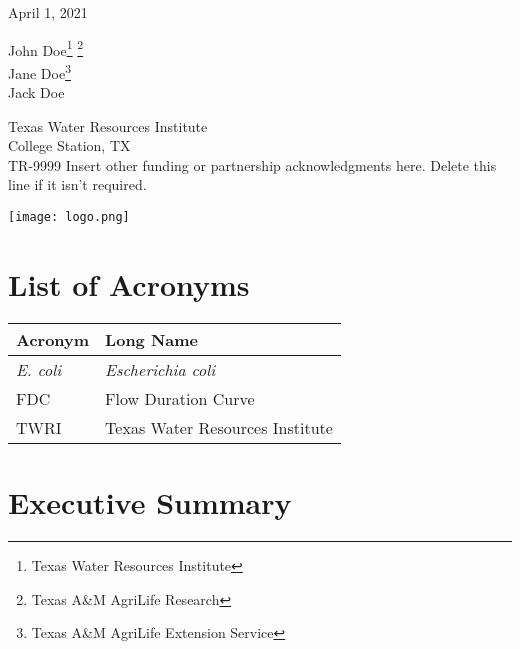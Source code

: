 \documentclass[fontsize=11pt,
titlepage=true,
footnotes=multiple
]{scrartcl}
\let\rmarkdownfootnote\footnote%
\def\footnote{\protect\rmarkdownfootnote}
\begin{document}
\begin{titlepage}

% 
\vspace*{4\baselineskip}
\begin{center}
\sffamily{\Huge\textcolor{twriblue}{Report Title}}


\rmfamily\normalsize{April 1, 2021}


\rmfamily\normalsize{John Doe\footnote{Texas Water Resources Institute\label{twri}} \footnote{Texas A\&M AgriLife Research\label{agr}}\\
Jane Doe\footnote{Texas A\&M AgriLife Extension Service\label{ext}}\\
Jack Doe}


\rmfamily\normalsize{Texas Water Resources Institute\\
College Station, TX\\
TR-9999}
\mbox{}
\vfill
\rmfamily\normalsize{Insert other funding or partnership acknowledgments here. Delete this line if it isn't required.}
\vspace{10mm} %

\texttt{[image: logo.png]}

\end{center}
\end{titlepage}
{
\hypersetup{linkcolor=black}
\setcounter{tocdepth}{2}
\tableofcontents
}
\listoftables
\listoffigures



\section*{List of Acronyms}

\begin{longtable}[]{@{}ll@{}}
\toprule
Acronym & Long Name \\
\midrule
\endhead
\emph{E. coli} & \emph{Escherichia coli} \\
FDC & Flow Duration Curve \\
TWRI & Texas Water Resources Institute \\
\bottomrule
\end{longtable}

\newpage

\hypertarget{executive-summary}{%
\section*{Executive Summary}\label{executive-summary}}
\end{document}
